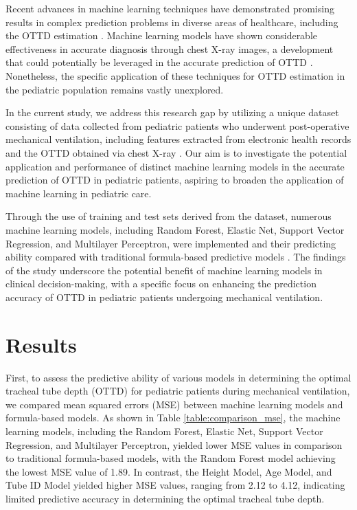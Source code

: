 \documentclass[11pt]{article}
\begin{document}
Recent advances in machine learning techniques have demonstrated promising results in complex prediction problems in diverse areas of healthcare, including the OTTD estimation \cite{Kim2016PredictionOE, Yoo2021DeepLF}. Machine learning models have shown considerable effectiveness in accurate diagnosis through chest X-ray images, a development that could potentially be leveraged in the accurate prediction of OTTD \cite{Kumar2020AccuratePO}. Nonetheless, the specific application of these techniques for OTTD estimation in the pediatric population remains vastly unexplored.

In the current study, we address this research gap by utilizing a unique dataset consisting of data collected from pediatric patients who underwent post-operative mechanical ventilation, including features extracted from electronic health records and the OTTD obtained via chest X-ray \cite{Rost2022TrachealTM, Ingelse2017EarlyFO, Holmes2018AirwayMP}. Our aim is to investigate the potential application and performance of distinct machine learning models in the accurate prediction of OTTD in pediatric patients, aspiring to broaden the application of machine learning in pediatric care.

Through the use of training and test sets derived from the dataset, numerous machine learning models, including Random Forest, Elastic Net, Support Vector Regression, and Multilayer Perceptron, were implemented and their predicting ability compared with traditional formula-based predictive models \cite{Driver2018EffectOU}. The findings of the study underscore the potential benefit of machine learning models in clinical decision-making, with a specific focus on enhancing the prediction accuracy of OTTD in pediatric patients undergoing mechanical ventilation.

\section*{Results}

First, to assess the predictive ability of various models in determining the optimal tracheal tube depth (OTTD) for pediatric patients during mechanical ventilation, we compared mean squared errors (MSE) between machine learning models and formula-based models. As shown in Table {}\ref{table:comparison_mse}, the machine learning models, including the Random Forest, Elastic Net, Support Vector Regression, and Multilayer Perceptron, yielded lower MSE values in comparison to traditional formula-based models, with the Random Forest model achieving the lowest MSE value of 1.89. In contrast, the Height Model, Age Model, and Tube ID Model yielded higher MSE values, ranging from 2.12 to 4.12, indicating limited predictive accuracy in determining the optimal tracheal tube depth.
\end{document}
